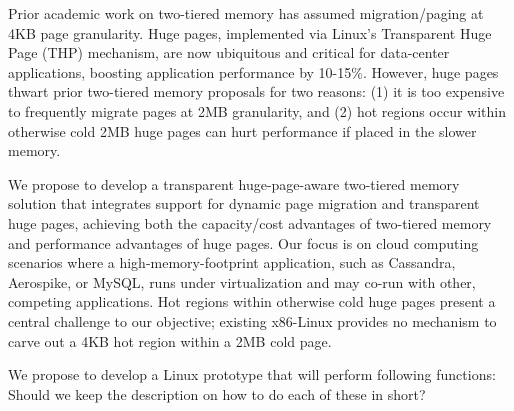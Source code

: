 Prior academic work on two-tiered memory has assumed migration/paging at 4KB
page granularity.  Huge pages, implemented via Linux's Transparent Huge Page
(THP) mechanism, are now ubiquitous and critical for data-center applications,
boosting application performance by 10-15\%.
However, huge pages thwart prior two-tiered memory proposals for two reasons:
(1) it is too expensive to frequently migrate pages at 2MB granularity, and (2)
hot regions occur within otherwise cold 2MB huge pages can hurt performance if
placed in the slower memory. 

We propose to develop a transparent huge-page-aware two-tiered memory solution
that integrates support for dynamic page migration and transparent huge pages,
achieving both the capacity/cost advantages of two-tiered memory and performance
advantages of huge pages.  Our focus is on cloud computing scenarios where a
high-memory-footprint application, such as Cassandra, Aerospike, or MySQL, runs
under virtualization and may co-run with other, competing applications.  Hot
regions within otherwise cold huge pages present a central challenge to our
objective; existing x86-Linux provides no mechanism to carve out a 4KB hot
region within a 2MB cold page.


We propose to develop a Linux prototype that will perform following functions:
{\color {red} Should we keep the description on how to do each of these in
short?}

